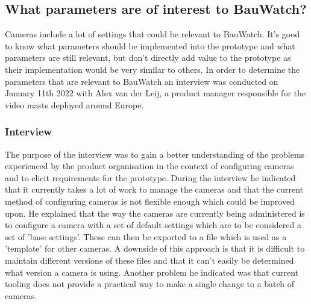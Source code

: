 \subsection{What parameters are of interest to BauWatch?}
Cameras include a lot of settings that could be relevant to BauWatch.
It's good to know what parameters should be implemented into the prototype and what parameters are still relevant, but don't directly add value to the prototype as their implementation would be very similar to others.
In order to determine the parameters that are relevant to BauWatch an interview was conducted on January 11th 2022 with Alex van der Leij, a product manager responsible for the video masts deployed around Europe.





\subsubsection{Interview}
The purpose of the interview was to gain a better understanding of the problems experienced
by the product organisation in the context of configuring cameras and to elicit requirements for the prototype. During the interview he indicated that it currently takes a lot of work to manage
the cameras and that the current method of configuring cameras is not flexible enough which could be improved upon. He explained that the way the cameras are currently being
administered is to configure a camera with a set of default settings which are to be considered a set of 'base settings'. These can then be exported to a file which is used as a
'template' for other
cameras. A downside of this approach is that it is difficult to maintain different versions of these files and that it can't easily be determined what version a camera is using.
Another problem he indicated was that current tooling does not provide a practical way to make a single change to a batch of cameras.


